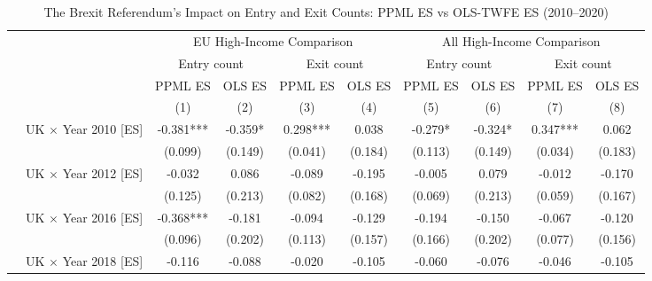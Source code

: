 \begin{table}[!ht]\centering\caption{\label{tab:entryexit\_counts\_es}The Brexit Referendum's Impact on Entry and Exit Counts: PPML ES vs OLS-TWFE ES (2010--2020)}\begin{threeparttable}\begin{tabular}{l*{8}{c}}\toprule
\multicolumn{1}{c}{} & \multicolumn{4}{c}{EU High-Income Comparison} & \multicolumn{4}{c}{All High-Income Comparison} \\
\cmidrule(lr){2-5}\cmidrule(lr){6-9}
\multicolumn{1}{c}{} & \multicolumn{2}{c}{Entry count} & \multicolumn{2}{c}{Exit count} & \multicolumn{2}{c}{Entry count} & \multicolumn{2}{c}{Exit count} \\
\cmidrule(lr){2-3}\cmidrule(lr){4-5}\cmidrule(lr){6-7}\cmidrule(lr){8-9}
\multicolumn{1}{c}{} & \multicolumn{1}{c}{PPML ES} & \multicolumn{1}{c}{OLS ES} & \multicolumn{1}{c}{PPML ES} & \multicolumn{1}{c}{OLS ES} & \multicolumn{1}{c}{PPML ES} & \multicolumn{1}{c}{OLS ES} & \multicolumn{1}{c}{PPML ES} & \multicolumn{1}{c}{OLS ES} \\
\midrule
                    &\multicolumn{1}{c}{(1)}&\multicolumn{1}{c}{(2)}&\multicolumn{1}{c}{(3)}&\multicolumn{1}{c}{(4)}&\multicolumn{1}{c}{(5)}&\multicolumn{1}{c}{(6)}&\multicolumn{1}{c}{(7)}&\multicolumn{1}{c}{(8)}\\
\midrule
~~UK $\times$ Year 2010 [ES]&      -0.381***&      -0.359*  &       0.298***&       0.038   &      -0.279*  &      -0.324*  &       0.347***&       0.062   \\
                    &     (0.099)   &     (0.149)   &     (0.041)   &     (0.184)   &     (0.113)   &     (0.149)   &     (0.034)   &     (0.183)   \\
~~UK $\times$ Year 2012 [ES]&      -0.032   &       0.086   &      -0.089   &      -0.195   &      -0.005   &       0.079   &      -0.012   &      -0.170   \\
                    &     (0.125)   &     (0.213)   &     (0.082)   &     (0.168)   &     (0.069)   &     (0.213)   &     (0.059)   &     (0.167)   \\
~~UK $\times$ Year 2016 [ES]&      -0.368***&      -0.181   &      -0.094   &      -0.129   &      -0.194   &      -0.150   &      -0.067   &      -0.120   \\
                    &     (0.096)   &     (0.202)   &     (0.113)   &     (0.157)   &     (0.166)   &     (0.202)   &     (0.077)   &     (0.156)   \\
~~UK $\times$ Year 2018 [ES]&      -0.116   &      -0.088   &      -0.020   &      -0.105   &      -0.060   &      -0.076   &      -0.046   &      -0.105   \\

\end{tabular}
\end{threeparttable}
\end{table}
